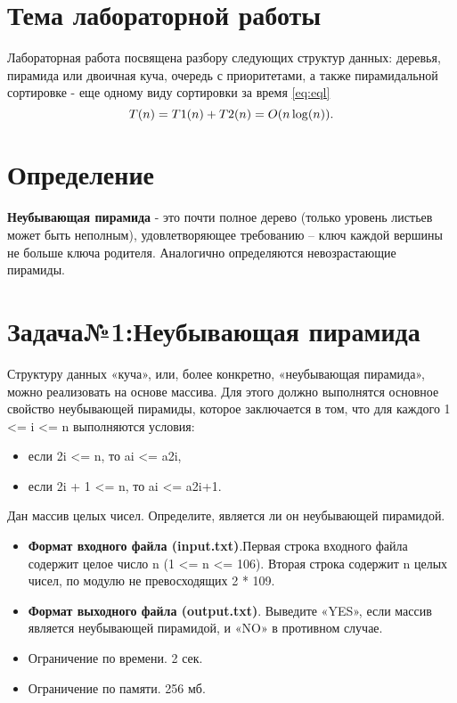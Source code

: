 \section{Тема лабораторной  работы}
Лабораторная работа посвящена разбору следующих структур данных: деревья, пирамида или двоичная куча, очередь с приоритетами, а также пирамидальной сортировке - еще одному виду сортировки за время \eqref{eq:eql}
\begin{equation}
    \centering
    \label{eq:eql}
    T(n) = T1(n) + T2(n) = O(n\log(n)).
\end{equation}


\section{Определение}
\textbf{Неубывающая пирамида} -  это почти полное дерево (только уровень листьев может быть неполным), удовлетворяющее требованию – ключ каждой вершины не больше ключа родителя. Аналогично определяются невозрастающие пирамиды.

\cite{algorithms_1, algorithms_2}

\section{Задача№1:Неубывающая пирамида}
Структуру данных «куча», или, более конкретно, «неубывающая пирамида», можно реализовать на основе массива.
Для этого должно выполнятся основное свойство неубывающей пирамиды, которое заключается в том, что для каждого 1 <= i <= n выполняются условия:

\begin{itemize}

\item если 2i <= n, то ai <= a2i,
\item если 2i + 1 <= n, то ai <= a2i+1.

\end{itemize}
Дан массив целых чисел. Определите, является ли он неубывающей пирамидой.
 \begin{itemize}
    \item \textbf{Формат входного файла (input.txt)}.Первая строка входного файла содержит целое число n (1 <= n <= 106). Вторая строка содержит n целых чисел, по модулю не превосходящих 2 * 109.
    \item \textbf{Формат выходного файла (output.txt)}. Выведите «YES», если массив является неубывающей пирамидой, и «NO» в противном случае.
	\item Ограничение по времени. 2 сек.
    \item Ограничение по памяти. 256 мб.
\end{itemize}

